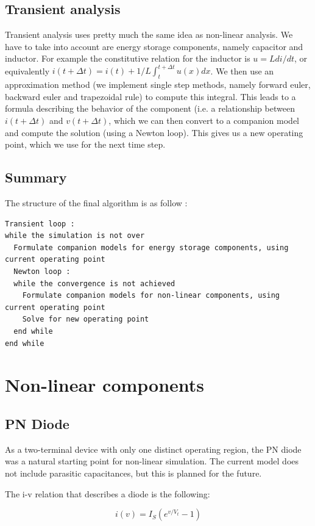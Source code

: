 \documentclass{article}
\begin{document}
\subsection{Transient analysis}
Transient analysis uses pretty much the same idea as non-linear analysis. We have to take into account are energy storage components, namely capacitor and inductor. For example the constitutive relation for the inductor is $u = L di/dt$, or equivalently $i(t+\Delta t) = i(t) + 1/L \int_t^{t+\Delta t} u(x) dx$. We then use an approximation method (we implement single step methods, namely forward euler, backward euler and trapezoidal rule) to compute this integral. This leads to a formula describing the behavior of the component (i.e. a relationship between $i(t+\Delta t)$ and $v(t+\Delta t)$, which we can then convert to a companion model and compute the solution (using a Newton loop). This gives us a new operating point, which we use for the next time step.
\subsection{Summary}
The structure of the final algorithm is as follow :
\begin{lstlisting}
Transient loop :
while the simulation is not over
  Formulate companion models for energy storage components, using current operating point
  Newton loop :
  while the convergence is not achieved
    Formulate companion models for non-linear components, using current operating point
    Solve for new operating point
  end while
end while
\end{lstlisting}
\section{Non-linear components}
\subsection{PN Diode}

As a two-terminal device with only one distinct operating region, the PN diode was a natural starting point for non-linear simulation.  The current model does not include parasitic capacitances, but this is planned for the future.

The i-v relation that describes a diode is the following:

\begin{equation}
i(v) = I_S(e^{v/V_t}-1)
\end{equation}
\end{document}
